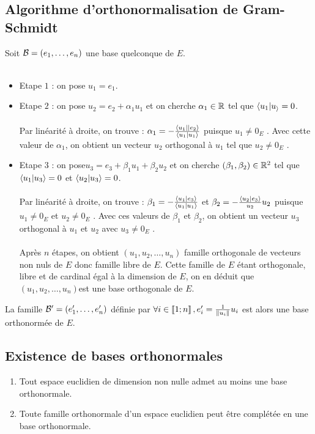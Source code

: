 \subsection{Algorithme d’orthonormalisation de Gram-Schmidt}
\begin{defprop}
    Soit \(\cal{B} = (e_1, \dots , e_n)\) une base quelconque de \(E\).\\~\\
    \begin{itemize}
        \item Etape \(1\) : on pose \(u_1 = e_1\).
        \item Etape \(2\) : on pose \(u_2 = e_2+ \alpha_1u_1\) et on cherche \(\alpha_1 \in \R\) tel que \(\scal{u_1}{u_} = 0\).\\~\\
        Par linéarité à droite, on trouve : \(\alpha_1 = - \frac{\scal{u_1|}{e_2}}{\scal{u_1}{u_1}}\) puisque \(u_1\neq 0_E\) . Avec cette valeur de \(\alpha_1\), on obtient un vecteur \(u_2\) orthogonal à \(u_1\) tel que \(u_2\neq 0_E\) .
        \item Etape \(3\) : on pose\( u_3 = e_3 + \beta_1u_1 + \beta_2u_2\) et on cherche \((\beta_1, \beta_2) \in \R^2\) tel que \(\scal{u_1}{u_3} = 0\) et \(\scal{u_2}{u_3} = 0\).\\~\\
        Par linéarité à droite, on trouve : \(\beta_1 = - \frac{\scal{u_1}{e_3}}{\scal{u_1}{u_1 }}\) et \(\beta_2 = - \frac{\scal{u_2}{e_3}}{u_2}{u_2}\) puisque \(u_1\neq 0_E\) et \(u_2\neq 0_E\) . Avec ces valeurs de \(\beta_1\) et \(\beta_2\), on obtient un vecteur \(u_3\) orthogonal à \(u_1\) et \(u_2\) avec \(u_3\neq 0_E\) .\\~\\
        Après \(n\) étapes, on obtient \((u_1, u_2, \dots , u_n)\) famille orthogonale de vecteurs non nuls de \(E\) donc famille libre de \(E\). Cette famille de \(E\) étant orthogonale, libre et de cardinal égal à la dimension de \(E\), on en déduit que \((u_1, u_2, \dots , u_n)\)est une base orthogonale de \(E\).
    \end{itemize}
    La famille \(\cal{B}' = (e'_1, \dots , e'_n)\) définie par \(\forall i \in \interventierii{1}{n}, e'_i = \frac{1}{\norme{u_i}}u_i\) est alors une base orthonormée de \(E\).
\end{defprop}
\subsection{Existence de bases orthonormales}
\begin{defprop}
    \begin{enumerate}
        \item Tout espace euclidien de dimension non nulle admet au moins une base orthonormale.
        \item Toute famille orthonormale d’un espace euclidien peut être complétée en une base orthonormale.
    \end{enumerate}
\end{defprop}
